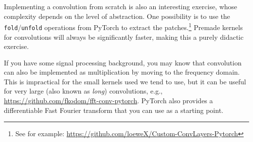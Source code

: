 Implementing a convolution from scratch is also an interesting exercise, whose complexity depends on the level of abstraction. One possibility is to use the \texttt{fold}/\texttt{unfold} operations from PyTorch to extract the patches.\footnote{See for example: \url{https://github.com/loeweX/Custom-ConvLayers-Pytorch}} Premade kernels for convolutions will always be significantly faster, making this a purely didactic exercise.

If you have some signal processing background, you may know that convolution can also be implemented as multiplication by moving to the frequency domain. This is impractical for the small kernels used we tend to use, but it can be useful for very large (also known as \textit{long}) convolutions, e.g., \url{https://github.com/fkodom/fft-conv-pytorch}. PyTorch also provides a differentiable Fast Fourier transform that you can use as a starting point.